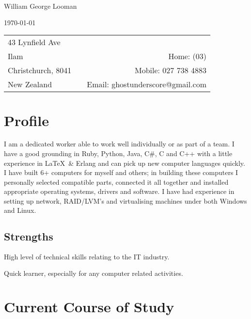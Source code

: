 \documentclass[10pt]{article}
\newenvironment{packed_items}{
    \begin{itemize}
    \setlength{\itemsep}{1pt}
    \setlength{\parskip}{0pt}
    \setlength{\parsep}{0pt}
}{\end{itemize}}
\begin{document}
    \begin{centering}
        {\LARGE William George Looman}
        
        {\today}
        
        {
            \begin{tabularx}{\textwidth}{lXr}
            43 Lynfield Ave     &  &                                  \\
            Ilam                &  &              Home: (03)  \\
            Christchurch, 8041  &  &             Mobile: 027 738 4883 \\
            New Zealand         &  & Email: ghostunderscore@gmail.com \\
            \end{tabularx}
        }
    \end{centering}
    \section*{Profile}\small
    \vspace{-5pt}

        I am a dedicated worker able to work well individually or as part of a
        team. I have a good grounding in Ruby, Python, Java, C\#, C and C++ with a little
        experience in \LaTeX\, \& Erlang and can pick up new computer languages
        quickly. I have built 6+ computers for myself and others; in building
        these computers I personally selected compatible parts, connected it all
        together and installed appropriate operating systems, drivers and
        software. I have had experience in setting up network, RAID/LVM’s and
        virtualising machines under both Windows and Linux.

        \subsection*{Strengths}
        \begin{packed_items}\small
            \item{High level of technical skills relating to the IT industry.}
            \item{Quick learner, especially for any computer related activities.}
        \end{packed_items}
    \section*{Current Course of Study}
    \vspace{-7pt}
\end{document}
